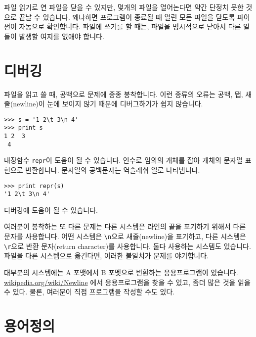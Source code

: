 파일 읽기로 연 파일을 닫을 수 있지만, 몇개의 파일을 열어논다면 약간 단정치 못한 것으로 끝날 수 있습니다. 
왜냐하면 프로그램이 종료될 때 열린 모든 파일을 닫도록 파이썬이 자동으로 확인합니다. 파일에 쓰기를 할 때는,
파일을 명시적으로 닫아서 다른 일들이 발생할 여지를 없애야 합니다.



\section{디버깅}


파일을 읽고 쓸 때, 공백으로 문제에 종종 봉착합니다.
이런 종류의 오류는 공백, 탭, 새줄(newline)이 눈에 보이지 않기 때문에 디버그하기가 쉽지 않습니다.

\beforeverb
\begin{verbatim}
>>> s = '1 2\t 3\n 4'
>>> print s
1 2	 3
 4
\end{verbatim}
\afterverb


내장함수 {\tt repr}이 도움이 될 수 있습니다. 인수로 임의의 개체를 잡아 개체의 문자열 표현으로 반환합니다.
문자열의 공백문자는 역슬래쉬 열로 나타냅니다.

\beforeverb
\begin{verbatim}
>>> print repr(s)
'1 2\t 3\n 4'
\end{verbatim}
\afterverb

디버깅에 도움이 될 수 있습니다.


여러분이 봉착하는 또 다른 문제는 다른 시스템은 라인의 끝을 표기하기 위해서 다른 문자를 사용합니다.
어떤 시스템은 \verb"\n"으로 새줄(newline)을 표기하고, 다른 시스템은 \verb"\r"으로 반환 문자(return character)를 사용합니다.
둘다 사용하는 시스템도 있습니다. 파일을 다른 시스템으로 옮긴다면, 이러한 불일치가 문제를 야기합니다.



대부분의 시스템에는 A 포맷에서 B 포멧으로 변환하는 응용프로그램이 있습니다.
\url{wikipedia.org/wiki/Newline} 에서 응용프로그램을 찾을 수 있고, 좀더 많은 것을 읽을 수 있다.
물론, 여러분이 직접 프로그램을 작성할 수도 있다.


\section{용어정의}

